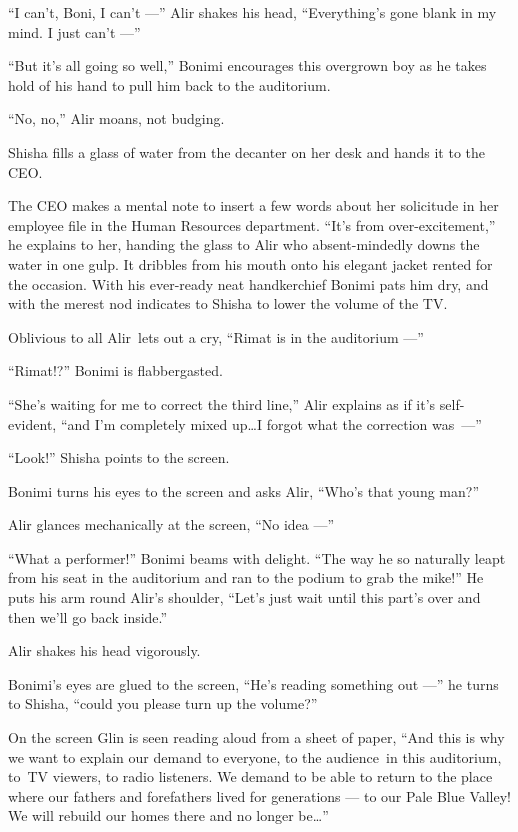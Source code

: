 \documentclass[twoside,11pt]{book}
\begin{document}
``I can't, Boni, I can't ---'' Alir shakes his head, ``Everything's gone blank in my mind. I
just can't ---''

``But it's all going so well,'' Bonimi encourages this overgrown boy as he takes hold of his
hand to pull him back to the auditorium.

``No, no,'' Alir moans, not budging.

Shisha fills a glass of water from the decanter on her desk and hands it to the CEO.

The CEO makes a mental note to insert a few words about her solicitude in her employee file in the Human Resources
department.  ``It's from over-excitement,'' he explains to her, handing the glass to Alir
who absent-mindedly downs the water in one gulp. It dribbles from his mouth onto his elegant jacket rented for the
occasion.  With his ever-ready neat handkerchief Bonimi pats him dry, and with the merest nod indicates to Shisha to
lower the volume of the TV.

Oblivious to all Alir~lets out a cry, ``Rimat is in the auditorium ---''

``Rimat!?'' Bonimi is flabbergasted.

``She's waiting for me to correct the third line,'' Alir explains as if it's self-evident,
``and I'm completely mixed up{\ldots}I forgot what the correction was~---''

``Look!'' Shisha points to the screen.

Bonimi turns his eyes to the screen and asks Alir, ``Who's that young man?''

Alir glances mechanically at the screen, ``No idea ---''

``What a performer!'' Bonimi beams with delight. ``The way he so naturally leapt
from his seat in the auditorium and ran to the podium to grab the mike!'' He puts his arm round Alir's
shoulder, ``Let's just wait until this part's over and then we'll go back inside.''

Alir shakes his head vigorously.

Bonimi's eyes are glued to the screen, ``He's reading something out ---'' he turns to Shisha,
``could you please turn up the volume?''

On the screen Glin is seen reading aloud from a sheet of paper, ``And this is why we want to explain our
demand to everyone, to the audience~in this auditorium, to~TV viewers, to radio listeners. We demand to be able to
return to the place where our fathers and forefathers lived for generations --- to our Pale Blue Valley! We will rebuild
our homes there and no longer be{\ldots}''
\end{document}
